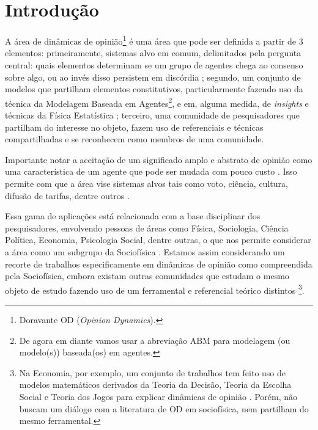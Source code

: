 \section{Introdução}

A área de dinâmicas de opinião\footnote{Doravante OD (\textit{Opinion
    Dynamics}).} é uma área que pode ser definida a partir de 3 elementos:
primeiramente, sistemas alvo em comum, delimitados pela pergunta central: quais
elementos determinam se um grupo de agentes chega ao consenso sobre algo, ou ao
invés disso persistem em discórdia \cite{castellano2012social} ; segundo, um
conjunto de modelos que partilham elementos constitutivos, particularmente
fazendo uso da técnica da Modelagem Baseada em Agentes\footnote{De agora em
  diante vamos usar a abreviação ABM para modelagem (ou modelo(s)) baseada(os)
  em agentes.}, e em, alguma medida, de \textit{insights} e técnicas da Física
Estatística \cite{galam1990social}; terceiro, uma comunidade de pesquisadores
que partilham do interesse no objeto, fazem uso de referenciais e técnicas
compartilhadas e se reconhecem como membros de uma comunidade.

Importante notar a aceitação de um significado amplo e abstrato de opinião como
uma característica de um agente que pode ser mudada com pouco custo
\cite[p.312]{castellano2012social}. Isso permite com que a área vise sistemas
alvos tais como voto, ciência, cultura, difusão de tarifas, dentre
outros
\cite{kowalska2013going,martins2015thou,axelrod1997dissemination,galam1990social}.

Essa gama de aplicações está relacionada com a base disciplinar dos pesquisadores,
envolvendo pessoas de áreas como Física, Sociologia, Ciência Política, Economia,
Psicologia Social, dentre outras, o que nos permite considerar a área como um
subgrupo da Sociofísica \cite{galam1982sociophysics,galam2012sociophysics}.
Estamos assim considerando um recorte de trabalhos especificamente em dinâmicas de
opinião como compreendida pela Sociofísica, embora existam outras comunidades
que estudam o mesmo objeto de estudo fazendo uso de um ferramental e referencial
teórico distintos \footnote{Na Economia, por exemplo, um
  conjunto de trabalhos tem feito uso de modelos matemáticos derivados da Teoria
  da Decisão, Teoria da Escolha Social e Teoria dos Jogos para explicar
  dinâmicas de opinião \cite{acemoglu2011opinion}. Porém, não buscam um diálogo
  com a literatura de OD em sociofísica, nem partilham do mesmo ferramental.}.

